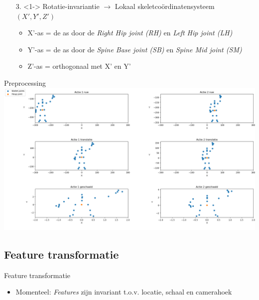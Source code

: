 \documentclass[]{beamer}
\begin{document}
	\begin{frame}
		\begin{enumerate}
			\item[3.]<1-> Rotatie-invariantie $\rightarrow$ Lokaal skeletcoördinatensysteem $(X', Y', Z')$
			\begin{itemize}
				\item X'-as = de as door de \textit{Right Hip joint (RH)} en \textit{Left Hip joint (LH)}
				\item Y'-as = de as door de \textit{Spine Base joint (SB)} en \textit{Spine Mid joint (SM)}
				\item Z'-as = orthogonaal met X' en Y'

			\end{itemize}
	\end{enumerate}
	\end{frame}
	\begin{frame}{Preprocessing}
	\includegraphics[width=\textwidth]{skeleton_preprocessing}
	\end{frame}
	
	\subsection{Feature transformatie}
	\begin{frame}{Feature transformatie}
		\begin{itemize}
			\item Momenteel: \textit{Features} zijn invariant t.o.v. locatie, schaal en camerahoek
		\end{itemize}
	\end{frame}
	
\end{document}
